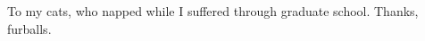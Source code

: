 \thispagestyle{empty}
\newenvironment{dedication}
  {\cleardoublepage \thispagestyle{empty} \vspace*{\stretch{1}} \begin{center} \em}
  {\end{center} \vspace*{\stretch{3}} \clearpage}
\begin{dedication}

\Large To my cats, who napped while I suffered through graduate school. Thanks, furballs. 

\end{dedication}
